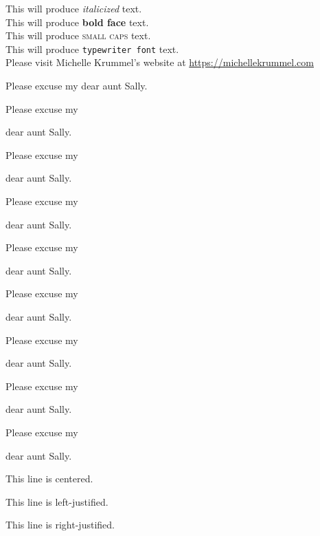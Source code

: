 \documentclass[11pt]{article}
\begin{document}
  This will produce \textit{italicized} text.\\
  This will produce \textbf{bold face} text.\\
  This will produce \textsc{small caps} text.\\
  This will produce \texttt{typewriter font} text.\\
  Please visit Michelle Krummel's website at \url{https://michellekrummel.com}

  \vspace{1cm}

  Please excuse my dear aunt Sally.

  Please excuse my \begin{large}dear aunt Sally.\end{large}

  Please excuse my \begin{Large}dear aunt Sally.\end{Large}

  Please excuse my \begin{huge}dear aunt Sally.\end{huge}

  Please excuse my \begin{Huge}dear aunt Sally.\end{Huge}

  Please excuse my \begin{normalsize}dear aunt Sally.\end{normalsize}

  Please excuse my \begin{small}dear aunt Sally.\end{small}

  Please excuse my \begin{scriptsize}dear aunt Sally.\end{scriptsize}

  Please excuse my \begin{tiny}dear aunt Sally.\end{tiny}

  \vspace{1cm}

  \begin{center}This line is centered.\end{center}

  \begin{flushleft}This line is left-justified.\end{flushleft}

  \begin{flushright}This line is right-justified.\end{flushright}
\end{document}
